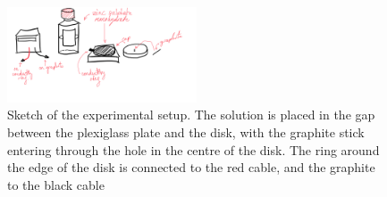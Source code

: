 \documentclass{article}
\theoremstyle{definition}
\theoremstyle{remark}
\begin{document}
\begin{figure}[H]
        \centering
        \includegraphics[width=0.5\textwidth]{FractalsSketch.png}
        \caption{\label{fig:Sketch} Sketch of the experimental setup. The solution is placed in the gap between the plexiglass plate and the disk, with the graphite stick entering through the hole in the centre of the disk. The ring around the edge of the disk is connected to the red cable, and the graphite to the black cable}
\end{figure}
\end{document}
